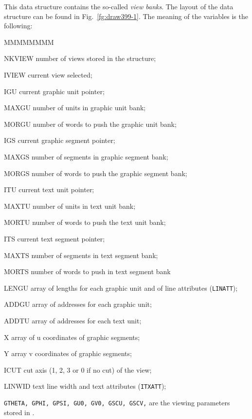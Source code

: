      

This data structure contains the so-called \emph{view banks}. The
layout of the data structure can be found in Fig.~\ref{fg:draw399-1}.
The meaning of the variables is the following:
 
\begin{DLtt}{MMMMMMMM}
\item[NKVIEW]    number of views stored in the structure;
\item[IVIEW]     current view selected;
\item[IGU]       current graphic unit pointer;
\item[MAXGU]     number of units in graphic unit bank;
\item[MORGU]     number of words to push the graphic unit bank;
\item[IGS]       current graphic segment pointer;
\item[MAXGS]     number of segments in graphic segment bank;
\item[MORGS]     number of words to push the graphic segment bank;
\item[ITU]       current text unit pointer;
\item[MAXTU]     number of units in text unit bank;
\item[MORTU]     number of words to push the text unit bank;
\item[ITS]       current text segment pointer;
\item[MAXTS]     number of segments in text segment bank;
\item[MORTS]     number of words to push in text segment bank
\item[LENGU]     array of lengths for each graphic unit and of line attributes
({\tt LINATT});
\item[ADDGU]     array of addresses for each graphic unit;
\item[ADDTU]     array of addresses for each text unit;
\item[X]         array of u coordinates of graphic segments;
\item[Y]         array  v  coordinates of graphic segments;
\item[ICUT]      cut axis (1, 2, 3 or 0 if no cut) of the view;
\item[LINWID]    text line width and text attributes ({\tt ITXATT});
\end{DLtt}
{\tt GTHETA, GPHI, GPSI, GU0, GV0, GSCU, GSCV,} are the viewing
parameters stored in .
 
